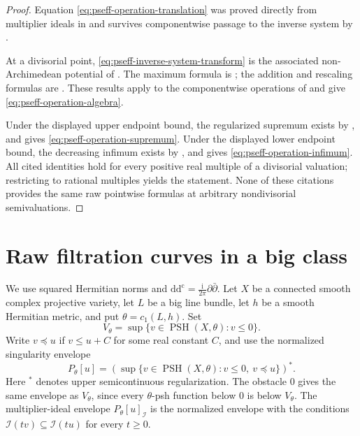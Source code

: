 \begin{proof}
Equation \eqref{eq:pseff-operation-translation} was proved directly from
multiplier ideals in  and survives
componentwise passage to the inverse system by
.

At a divisorial point, \eqref{eq:pseff-inverse-system-transform} is the
associated non-Archimedean potential of
\cite[formula~(3.7)]{Xia23Operations}.  The maximum formula is
\cite[Corollary~4.8]{Xia23Operations}; the addition and rescaling formulas
are \cite[Lemma~4.17]{Xia23Operations}.  These results apply to the
componentwise operations of
 and give
\eqref{eq:pseff-operation-algebra}.

Under the displayed upper endpoint bound, the regularized supremum exists
by , and
\cite[Theorem~4.13]{Xia23Operations} gives
\eqref{eq:pseff-operation-supremum}.  Under the displayed lower endpoint
bound, the decreasing infimum exists by
, and
\cite[Lemma~4.10]{Xia23Operations} gives
\eqref{eq:pseff-operation-infimum}.  All cited identities hold for every
positive real multiple of a divisorial valuation; restricting to rational
multiples yields the statement.  None of these citations provides the
same raw pointwise formulas at arbitrary nondivisorial semivaluations.
\end{proof}

\section{Raw filtration curves in a big class}
\label{sec:pseff-filtration-maximality}

We use squared Hermitian norms and
\(\mathrm d\mathrm d^{\mathrm c}
 =\frac{\mathrm i}{2\pi}\partial\bar\partial\).
Let \(X\) be a connected smooth complex projective variety, let \(L\) be a
big line bundle, let \(h\) be a smooth Hermitian metric, and put
\(\theta=c_1(L,h)\).  Set
\[
 V_\theta=\sup\{v\in\operatorname{PSH}(X,\theta):v\leq0\}.
\]
Write \(v\preceq u\) if \(v\leq u+C\) for some real constant \(C\), and use
the normalized singularity envelope
\[
 P_\theta[u]
 =\left(\sup\{v\in\operatorname{PSH}(X,\theta):
                  v\leq0,\ v\preceq u\}\right)^*.
\]
Here \({}^*\) denotes upper semicontinuous regularization.  The obstacle
\(0\) gives the same envelope as \(V_\theta\), since every
\(\theta\)-psh function below \(0\) is below \(V_\theta\).
The multiplier-ideal envelope \(P_\theta[u]_{\mathcal I}\) is the
normalized envelope with the conditions
\(\mathcal I(tv)\subseteq\mathcal I(tu)\) for every \(t\geq0\).

